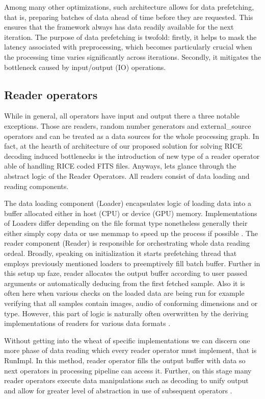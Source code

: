 \documentclass[licencjacka,en]{pracamgr}
\begin{document}
Among many other optimizations, such architecture allows for data prefetching, that is, preparing batches of data ahead of time before they are requested. This ensures that the framework always has data readily available for the next iteration. The purpose of data prefetching is twofold: firstly, it helps to mask the latency associated with preprocessing, which becomes particularly crucial when the processing time varies significantly across iterations. Secondly, it mitigates the bottleneck caused by input/output (IO) operations. \cite{blogpost}

\subsection{Reader operators}

While in general, all operators have input and output there a three notable exceptions. Those are  readers, random number generators and external\_source operators and can be treated as a data sources for the whole processing graph\cite{blogpost}. In fact, at the hearth of architecture of our proposed solution for solving RICE decoding induced bottlenecks is the introduction of new type of a reader operator able of handling RICE coded FITS files. Anyways, lets glance through the abstract logic of the Reader Operators. All readers consist of data loading and reading components.

The data loading component (Loader) encapsulates logic of loading data into a buffer allocated either in host (CPU) or device (GPU) memory. Implementations of Loaders differ depending on the file format type nonetheless generally their either simply copy data or use memmap to speed up the process if possible \cite{dali-readers}.
The reader component (Reader) is responsible for orchestrating whole data reading ordeal. Broadly, speaking on initialization it starts prefetching thread that employs previously mentioned loaders to preemptively fill batch buffer. Further in this setup up faze, reader allocates the output buffer according to user passed arguments or automatically deducing from the first fetched sample.  Also it is often here when various checks on the loaded data are being run for example verifying that all samples contain images, audio of conforming dimensions and or type.  However, this part of logic is naturally often overwritten by the deriving implementations of readers for various data formats \cite{dali-readers}.  

Without getting into the wheat of specific implementations we can discern one more phase of data reading which every reader operator must implement, that is RunImpl. In this method, reader operator fills the output buffer with data so next operators in processing pipeline can access it. Further, on this stage many reader operators execute data manipulations such as decoding to unify output and allow for greater level of abstraction in use of subsequent operators \cite{dali-readers}. 
\end{document}
